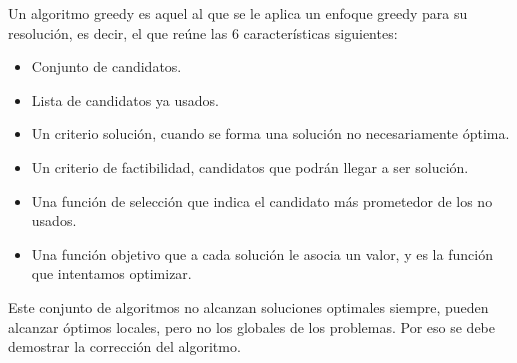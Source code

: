 Un algoritmo greedy es aquel al que se le aplica un enfoque greedy para su resolución, es decir, el que reúne las 6 características siguientes:
\begin{itemize}
    \item Conjunto de candidatos.
    \item Lista de candidatos ya usados.
    \item Un criterio solución, cuando se forma una solución no necesariamente óptima.
    \item Un criterio de factibilidad, candidatos que podrán llegar a ser solución.
    \item Una función de selección que indica el candidato más prometedor de los no usados.
    \item Una función objetivo que a cada solución le asocia un valor, y es la función que intentamos optimizar.
\end{itemize}

Este conjunto de algoritmos no alcanzan soluciones optimales siempre, pueden alcanzar óptimos locales, pero no los globales de los problemas.
Por eso se debe demostrar la corrección del algoritmo.